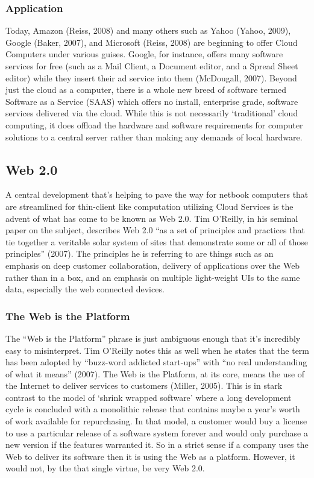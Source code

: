 \documentclass[12pt,oneside,letterpaper]{article}
\begin{document}
\subsubsection{Application}

Today, Amazon (Reiss, 2008) and many others such as Yahoo (Yahoo, 2009), Google
(Baker, 2007), and Microsoft (Reiss, 2008) are beginning to offer Cloud
Computers under various guises.  Google, for instance, offers many software
services for free (such as a Mail Client, a Document editor, and a Spread Sheet
editor) while they insert their ad service into them (McDougall, 2007).  Beyond
just the cloud as a computer, there is a whole new breed of software termed
Software as a Service (SAAS) which offers no install, enterprise grade, software
services delivered via the cloud.  While this is not necessarily `traditional'
cloud computing, it does offload the hardware and software requirements for
computer solutions to a central server rather than making any demands of local
hardware.

\subsection{Web 2.0}

A central development that's helping to pave the way for netbook computers that
are streamlined for thin-client like computation utilizing Cloud Services is the
advent of what has come to be known as Web 2.0.  Tim O'Reilly, in his seminal
paper on the subject, describes Web 2.0 ``as a set of principles and practices
that tie together a veritable solar system of sites that demonstrate some or all
of those principles'' (2007). The principles he is referring to are things such
as an emphasis on deep customer collaboration, delivery of applications over the
Web rather than in a box, and an emphasis on multiple light-weight UIs to the
same data, especially the web connected devices.

\subsubsection{The Web is the Platform}

The ``Web is the Platform'' phrase is just ambiguous enough that it's incredibly
easy to misinterpret.  Tim O'Reilly notes this as well when he states that the
term has been adopted by ``buzz-word addicted start-ups'' with ``no real
understanding of what it means'' (2007).  The Web is the Platform, at its core,
means the use of the Internet to deliver services to customers (Miller, 2005).
This is in stark contrast to the model of `shrink wrapped software' where a long
development cycle is concluded with a monolithic release that contains maybe a
year's worth of work available for repurchasing.  In that model, a customer
would buy a license to use a particular release of a software system forever and
would only purchase a new version if the features warranted it.  So in a strict
sense if a company uses the Web to deliver its software then it is using the Web
as a platform.  However, it would not, by the that single virtue, be very Web
2.0.
\end{document}
